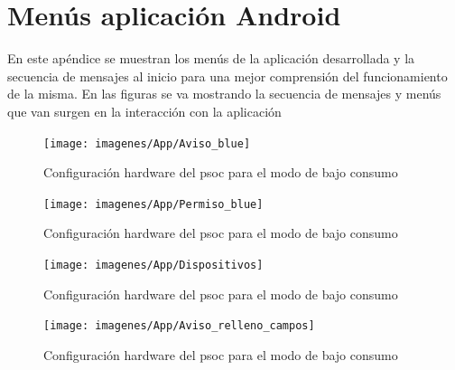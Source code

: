 \newpage
\section{Menús aplicación Android}

En este apéndice se muestran los menús de la aplicación desarrollada y la secuencia de mensajes al inicio para una mejor comprensión del funcionamiento de la misma. En las figuras se va mostrando la secuencia de mensajes y menús que van surgen en la interacción con la aplicación



\begin{figure}[!ht]
\center
\texttt{[image: imagenes/App/Aviso\_blue]}
\caption{Configuración hardware del \acrshort{psoc} para el modo de bajo consumo}
\end{figure}

\begin{figure}[!ht]
\center
\texttt{[image: imagenes/App/Permiso\_blue]}
\caption{Configuración hardware del \acrshort{psoc} para el modo de bajo consumo}
\end{figure}

\begin{figure}[!ht]
\center
\texttt{[image: imagenes/App/Dispositivos]}
\caption{Configuración hardware del \acrshort{psoc} para el modo de bajo consumo}
\end{figure}

\begin{figure}[!ht]
\center
\texttt{[image: imagenes/App/Aviso\_relleno\_campos]}
\caption{Configuración hardware del \acrshort{psoc} para el modo de bajo consumo}
\end{figure}



